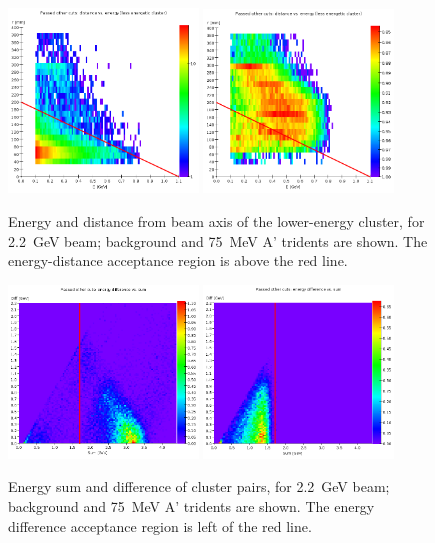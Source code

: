 \begin{figure}[ht]
	\includegraphics[width=0.45\textwidth]{performance/trigger/energy-distance_22}
	\includegraphics[width=0.45\textwidth]{performance/trigger/energy-distance_22_075mev}
	\caption{\small{Energy and distance from beam axis of the lower-energy cluster, for 2.2~GeV beam; background and 75~MeV A' tridents are shown. The energy-distance acceptance region is above the red line.}}
	\label{fig:energy-distance}
\end{figure}

\begin{figure}[ht]
	\includegraphics[width=0.45\textwidth]{performance/trigger/ediff_22}
	\includegraphics[width=0.45\textwidth]{performance/trigger/ediff_22_075mev}
	\caption{\small{Energy sum and difference of cluster pairs, for 2.2~GeV beam; background and 75~MeV A' tridents are shown. The energy difference acceptance region is left of the red line.}}
	\label{fig:ediff}
\end{figure}

